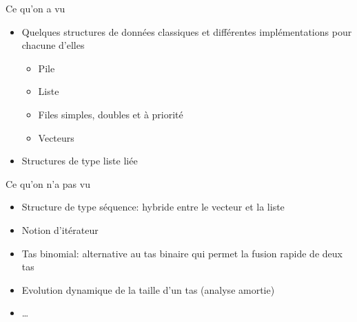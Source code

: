\begin{frame}{Ce qu'on a vu}

\begin{itemize}
\item Quelques structures de données classiques et différentes implémentations pour chacune d'elles
\begin{itemize}
\item Pile
\item Liste
\item Files simples, doubles et à priorité
\item Vecteurs
\end{itemize}
\item Structures de type liste liée
\end{itemize}

\end{frame}

\begin{frame}{Ce qu'on n'a pas vu}

\begin{itemize}
\item Structure de type séquence: hybride entre le vecteur et la
  liste
\item Notion d'itérateur
\item Tas binomial: alternative au tas binaire qui permet la fusion
  rapide de deux tas
\item Evolution dynamique de la taille d'un tas (analyse amortie)
\item \ldots
\end{itemize}

\end{frame}
